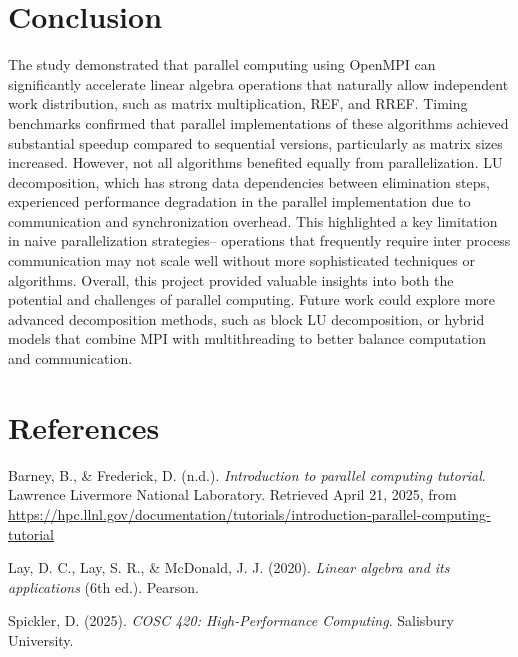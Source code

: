 \documentclass[12pt]{article}
\begin{document}
\section{Conclusion}
The study demonstrated that parallel computing using OpenMPI can significantly accelerate linear algebra operations that naturally allow independent work distribution, such as matrix multiplication, REF, and RREF. Timing benchmarks confirmed that parallel implementations of these algorithms achieved substantial speedup compared to sequential versions, particularly as matrix sizes increased.
However, not all algorithms benefited equally from parallelization. LU decomposition, which has strong data dependencies between elimination steps, experienced performance degradation in the parallel implementation due to communication and synchronization overhead. This highlighted a key limitation in naive parallelization strategies-- operations that frequently require inter process communication may not scale well without more sophisticated techniques or algorithms.
Overall, this project provided valuable insights into both the potential and challenges of parallel computing. Future work could explore more advanced decomposition methods, such as block LU decomposition, or hybrid models that combine MPI with multithreading to better balance computation and communication. 

\newpage
\section*{References}

\begin{thebibliography}{9}

Barney, B., \& Frederick, D. (n.d.). \textit{Introduction to parallel computing tutorial}. Lawrence Livermore National Laboratory. Retrieved April 21, 2025, from \url{https://hpc.llnl.gov/documentation/tutorials/introduction-parallel-computing-tutorial}

Lay, D. C., Lay, S. R., \& McDonald, J. J. (2020). \textit{Linear algebra and its applications} (6th ed.). Pearson.

Spickler, D. (2025). \textit{COSC 420: High-Performance Computing}. Salisbury University.

\end{thebibliography}
    
\end{document}
